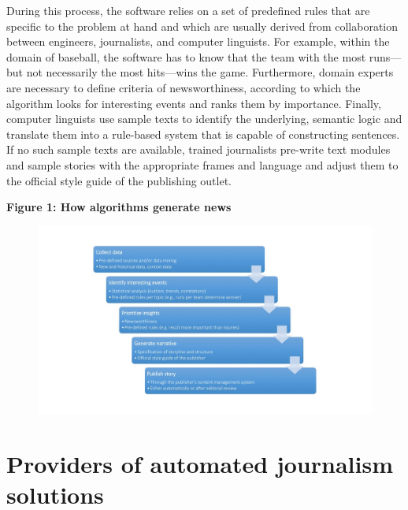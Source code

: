 \documentclass[notoc, symmetric, nobib, nols]{towcenter-guideto-book}
\begin{document}
During this process, the software relies on a set of predefined rules that are specific to the problem at hand and which are usually derived from collaboration between engineers, journalists, and computer linguists. For example, within the domain of baseball, the software has to know that the team with the most runs---but not necessarily the most hits---wins the game. Furthermore, domain experts are necessary to define criteria of newsworthiness, according to which the algorithm looks for interesting events and ranks them by importance. Finally, computer linguists use sample texts to identify the underlying, semantic logic and translate them into a rule-based system that is capable of constructing sentences. If no such sample texts are available, trained journalists pre-write text modules and sample stories with the appropriate frames and language and adjust them to the official style guide of the publishing outlet.
 
\textbf{Figure 1: How algorithms generate news}
\begin{figure}
\begin{centering}
\includegraphics[width=\textwidth]{graphics/aj_image1.jpg}
\end{centering}
\end{figure}

\section{Providers of automated journalism solutions}
\end{document}

